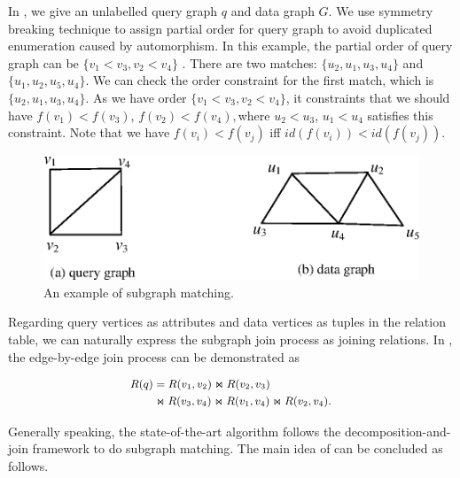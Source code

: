 \begin{example}
\label{ex:subgraph_isomorphism}	
In , we give an unlabelled query graph $q$ and data graph $G$. We use symmetry breaking technique\cite{Grochow2007} to assign partial order for query graph to avoid duplicated enumeration caused by automorphism. In this example, the partial order of query graph can be $\{v_1 < v_3, v_2 < v_4\}$ . There are two matches: $\{u_2, u_1, u_3, u_4\}$ and $\{u_1, u_2, u_5, u_4\}$. We can check the order constraint for the first match, which is $\{u_2, u_1, u_3, u_4\}$. As we have order $\{v_1 < v_3, v_2 < v_4\}$, it constraints that we should have $f(v_1) < f(v_3)$, $f(v_2) < f(v_4), $where $u_2 < u_3$, $u_1 < u_4$ satisfies this constraint. Note that we have $f(v_i) < f(v_j)$ iff $id(f(v_i)) < id(f(v_j))$. 
\end{example}

\begin{figure}[htb]
  \centering
  \includegraphics[scale=0.6]{figures/subg.eps}
  \caption{\small{An example of subgraph matching.}}
  \label{fig:subgraph_isomorphism}
\end{figure}

Regarding query vertices as attributes and data vertices as tuples in the relation table, we can naturally express the subgraph join process as joining relations. In , the edge-by-edge join process can be demonstrated as

\begin{equation}
\label{eq:subgraph_isomorphism}
\small
\begin{aligned}
	R(q) &= R(v_1, v_2) \Join R(v_2, v_3) \\
	&\Join R(v_3, v_4) \Join R(v_1, v_4) \Join R(v_2, v_4).
\end{aligned}
\end{equation}

 Generally speaking, the state-of-the-art algorithm \cliquejoin follows the decomposition-and-join framework to do subgraph matching. The main idea of \cliquejoin can be concluded as follows. 

